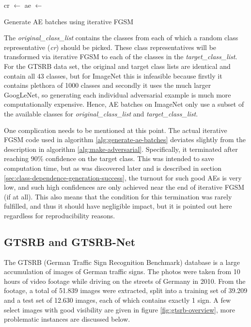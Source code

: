 \documentclass[11pt, a4paper]{article}
\begin{document}
\begin{algorithm}
	\begin{algorithmic}
				\State cr $\gets$ 
					\State ae $\gets$  
				\EndFor
			\EndFor
	\end{algorithmic}
	\caption[Generating AE batches]{Generate AE batches using iterative FGSM}
	\label{alg:generate-ae-batches}
\end{algorithm}

The \emph{original\_class\_list} contains the classes from each of which a random class representative (\emph{cr}) should be picked. These class representatives will be transformed via iterative FGSM to each of the classes in the \emph{target\_class\_list}. For the GTSRB data set, the original and target class lists are identical and contain all $43$ classes, but for ImageNet this is infeasible because firstly it contains plethora of 1000 classes and secondly it uses the much larger GoogLeNet, so generating each individual adversarial example is much more computationally expensive. Hence, AE batches on ImageNet only use a subset of the available classes for \emph{original\_class\_list} and \emph{target\_class\_list}.

One complication needs to be mentioned at this point. The actual iterative FGSM code used in algorithm \ref{alg:generate-ae-batches} deviates slightly from the description in algorithm \ref{alg:make-adversarial}. Specifically, it terminated after reaching $90\%$ confidence on the target class. This was intended to save computation time, but as was discovered later and is described in section \ref{sec:class-dependence-generation-success}, the turnout for such good AEs is very low, and such high confidences are only achieved near the end of iterative FGSM (if at all). This also means that the condition for this termination was rarely fulfilled, and thus it should have negligible impact, but it is pointed out here regardless for reproducibility reasons.

\subsection{GTSRB and GTSRB-Net}
\label{sec:generation-large-sets:gtsrb}
The GTSRB (German Traffic Sign Recognition Benchmark) database is a large accumulation of images of German traffic signs. The photos were taken from 10 hours of video footage while driving on the streets of Germany in 2010. From the footage, a total of 51.839 images were extracted, split into a training set of 39.209 and a test set of 12.630 images, each of which contains exactly 1 sign. A few select images with good visibility are given in figure \ref{fig:gtsrb-overview}, more problematic instances are discussed below.
\end{document}

